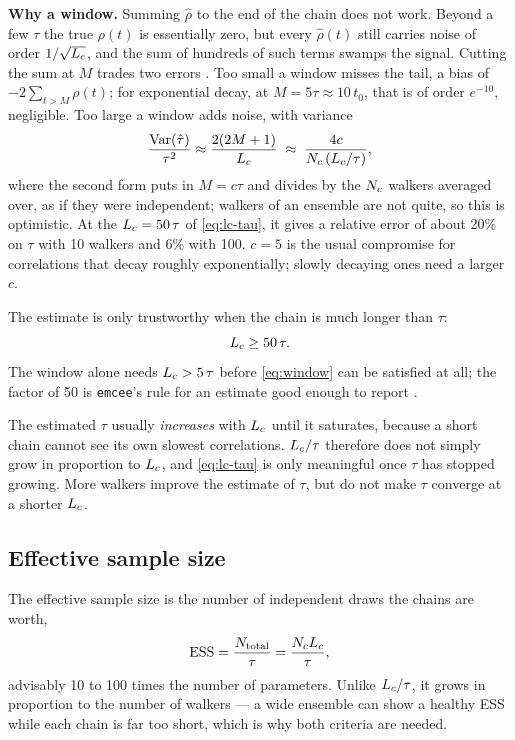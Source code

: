 \textbf{Why a window.} Summing $\hat\rho$ to the end of the chain does not work. Beyond a few $\tau$
the true $\rho(t)$ is essentially zero, but every $\hat\rho(t)$ still carries noise of order
$1/\sqrt{L_c}$, and the sum of hundreds of such terms swamps the signal. Cutting the sum at $M$
trades two errors \citep{sokal1997}. Too small a window misses the tail, a bias of
$-2\sum_{t>M}\rho(t)$; for exponential decay, at $M = 5\tau \approx 10\,t_0$, that is of order
$e^{-10}$, negligible. Too large a window adds noise, with variance
\begin{equation}
  \frac{\mathrm{Var}(\hat\tau)}{\tau^2} \approx \frac{2(2M+1)}{L_c}
  \;\approx\; \frac{4c}{N_c\,(L_c/\tau)} ,
  \label{eq:tau-variance}
\end{equation}
where the second form puts in $M = c\tau$ and divides by the $N_c$ walkers averaged over, as if
they were independent; walkers of an ensemble are not quite, so this is optimistic. At the
$L_c = 50\,\tau$ of \cref{eq:lc-tau}, it gives a relative error of about 20\% on $\tau$ with 10
walkers and 6\% with 100. $c = 5$ is the usual compromise for correlations that decay roughly
exponentially; slowly decaying ones need a larger $c$.

The estimate is only trustworthy when the chain is much longer than $\tau$:
\begin{equation}
  L_c \ge 50\,\tau .
  \label{eq:lc-tau}
\end{equation}
The window alone needs $L_c > 5\,\tau$ before \cref{eq:window} can be satisfied at all; the
factor of 50 is \texttt{emcee}'s rule for an estimate good enough to report \citep{foreman2013}.

\begin{cautionbox}
The estimated $\tau$ usually \emph{increases} with $L_c$ until it saturates, because a short chain
cannot see its own slowest correlations. $L_c/\tau$ therefore does not simply grow in proportion
to $L_c$, and \cref{eq:lc-tau} is only meaningful once $\tau$ has stopped growing. More walkers
improve the estimate of $\tau$, but do not make $\tau$ converge at a shorter $L_c$.
\end{cautionbox}

\subsection{Effective sample size}

The effective sample size is the number of independent draws the chains are worth,
\begin{equation}
  \mathrm{ESS} = \frac{N_{\mathrm{total}}}{\tau} = \frac{N_c L_c}{\tau},
  \label{eq:ess}
\end{equation}
advisably 10 to 100 times the number of parameters. Unlike $L_c/\tau$, it grows in proportion to
the number of walkers --- a wide ensemble can show a healthy ESS while each chain is far too short,
which is why both criteria are needed.

